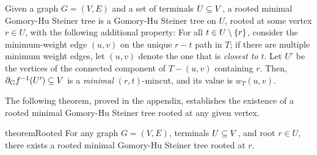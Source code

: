 \label{defn:minimalGH}
Given a graph $G=(V,E)$ and a set of terminals $U\subseteq V$, a rooted minimal Gomory-Hu Steiner tree is a Gomory-Hu Steiner tree on $U$, rooted at some vertex $r\in U$, with the following additional property:
 \BI
 \im[$(*)$] For all $t\in U\setminus\{r\}$, consider the minimum-weight edge $(u,v)$ on the unique $r-t$ path in $T$; if there are multiple minimum weight edges, let $(u, v)$ denote the one that is {\em closest to $t$}. Let $U'$ be the vertices of the connected component of $T-(u,v)$ containing $r$.
Then, $\partial_Gf^{-1}(U')\subseteq V$ is a \emph{minimal} $(r,t)$-mincut, and its value is $w_T(u,v)$.
 \EI
\ED

The following theorem, proved in the appendix, establishes the existence of a rooted minimal Gomory-Hu Steiner tree rooted at any given vertex.

\begin{restatable}{theorem}{Rooted}
For any graph $G=(V,E)$, terminals $U\subseteq V$, and root $r\in U$, there exists a rooted minimal Gomory-Hu Steiner tree rooted at $r$.
\end{restatable}

